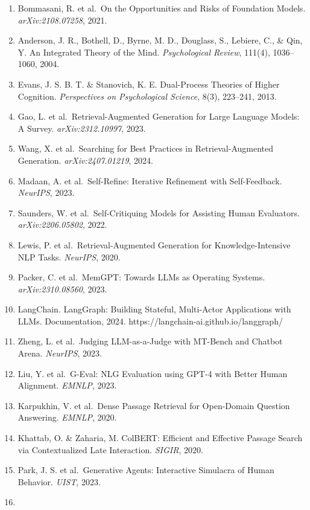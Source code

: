 \documentclass[11pt,a4paper]{article}
\begin{document}
\begin{enumerate}
\def\labelenumi{\arabic{enumi}.}
\tightlist
\item
  Bommasani, R. et al.~On the Opportunities and Risks of Foundation
  Models. \emph{arXiv:2108.07258}, 2021.
\item
  Anderson, J. R., Bothell, D., Byrne, M. D., Douglass, S., Lebiere, C.,
  \& Qin, Y. An Integrated Theory of the Mind. \emph{Psychological
  Review}, 111(4), 1036--1060, 2004.
\item
  Evans, J. S. B. T. \& Stanovich, K. E. Dual-Process Theories of Higher
  Cognition. \emph{Perspectives on Psychological Science}, 8(3),
  223--241, 2013.
\item
  Gao, L. et al.~Retrieval-Augmented Generation for Large Language
  Models: A Survey. \emph{arXiv:2312.10997}, 2023.
\item
  Wang, X. et al.~Searching for Best Practices in Retrieval-Augmented
  Generation. \emph{arXiv:2407.01219}, 2024.
\item
  Madaan, A. et al.~Self-Refine: Iterative Refinement with
  Self-Feedback. \emph{NeurIPS}, 2023.
\item
  Saunders, W. et al.~Self-Critiquing Models for Assisting Human
  Evaluators. \emph{arXiv:2206.05802}, 2022.
\item
  Lewis, P. et al.~Retrieval-Augmented Generation for
  Knowledge-Intensive NLP Tasks. \emph{NeurIPS}, 2020.
\item
  Packer, C. et al.~MemGPT: Towards LLMs as Operating Systems.
  \emph{arXiv:2310.08560}, 2023.
\item
  LangChain. LangGraph: Building Stateful, Multi-Actor Applications with
  LLMs. Documentation, 2024. https://langchain-ai.github.io/langgraph/
\item
  Zheng, L. et al.~Judging LLM-as-a-Judge with MT-Bench and Chatbot
  Arena. \emph{NeurIPS}, 2023.
\item
  Liu, Y. et al.~G-Eval: NLG Evaluation using GPT-4 with Better Human
  Alignment. \emph{EMNLP}, 2023.
\item
  Karpukhin, V. et al.~Dense Passage Retrieval for Open-Domain Question
  Answering. \emph{EMNLP}, 2020.
\item
  Khattab, O. \& Zaharia, M. ColBERT: Efficient and Effective Passage
  Search via Contextualized Late Interaction. \emph{SIGIR}, 2020.
\item
  Park, J. S. et al.~Generative Agents: Interactive Simulacra of Human
  Behavior. \emph{UIST}, 2023.
\item

\end{enumerate}
\end{document}
